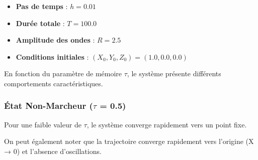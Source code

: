 \begin{itemize}
    \item \textbf{Pas de temps} : $h = 0.01$
    \item \textbf{Durée totale} : $T = 100.0$
    \item \textbf{Amplitude des ondes} : $R = 2.5$
    \item \textbf{Conditions initiales} : $(X_0, Y_0, Z_0) = (1.0, 0.0, 0.0)$
\end{itemize}




En fonction du paramètre de mémoire $\tau$, le système présente différents comportements caractéristiques.

\subsubsection{État Non-Marcheur ($\tau$ = 0.5) }
Pour une faible valeur de $\tau$, le système converge rapidement vers un point fixe.

On peut également noter que la trajectoire converge rapidement vers l'origine (X → 0) et l'absence d'oscillations.

